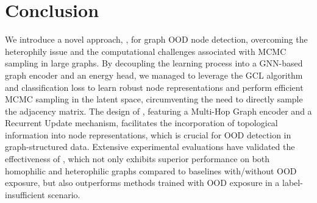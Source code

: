 \vspace{-1mm}
\section{Conclusion}
\vspace{-1mm}
We introduce a novel approach, \textbf{\shortname}, for graph OOD node detection, overcoming the heterophily issue and the computational challenges associated with MCMC sampling in large graphs. By decoupling the learning process into a GNN-based graph encoder and an energy head, we managed to leverage the GCL algorithm and classification loss to learn robust node representations and perform efficient MCMC sampling in the latent space, circumventing the need to directly sample the adjacency matrix. 
The design of \textbf{\shortname}, featuring a Multi-Hop Graph encoder and a Recurrent Update mechanism, facilitates the incorporation of topological information into node representations, which is crucial for OOD detection in graph-structured data. 
Extensive experimental evaluations have validated the effectiveness of \textbf{\shortname}, which not only exhibits superior performance on both homophilic and heterophilic graphs compared to baselines with/without OOD exposure, but also outperforms methods trained with OOD exposure in a label-insufficient scenario.

\clearpage
\thispagestyle{empty}